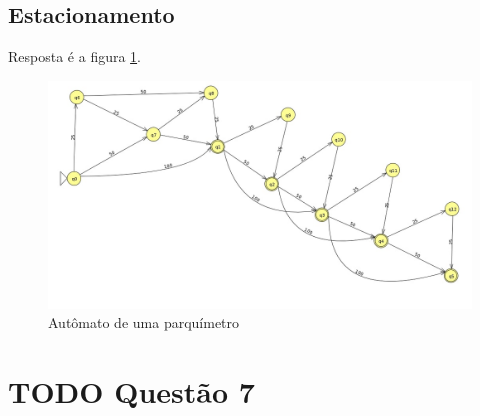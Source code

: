\documentclass[11pt]{article}
\begin{document}
\subsection{Estacionamento}
\label{sec:org6b945f2}
Resposta é a figura \ref{fig:org516f8c2}.
\begin{figure}[htbp]
\centering
\includegraphics[width=.9\linewidth]{./q6/estacionamento.jpg}
\caption{\label{fig:org516f8c2}
Autômato de uma parquímetro}
\end{figure}
\section{{\bfseries\sffamily TODO} Questão 7}
\label{sec:org4f66f0f}
\end{document}
